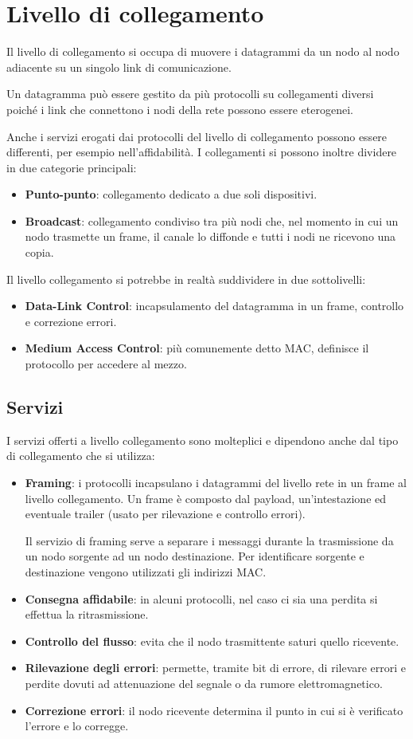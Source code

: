 \chapter{Livello di collegamento}
Il livello di collegamento si occupa di muovere i datagrammi da un
nodo al nodo adiacente su un singolo link di comunicazione.

Un datagramma può essere gestito da più protocolli su collegamenti 
diversi poiché i link che connettono i nodi della rete possono essere
eterogenei.

Anche i servizi erogati dai protocolli del livello di collegamento 
possono essere differenti, per esempio nell'affidabilità. I 
collegamenti si possono inoltre dividere in due categorie principali:
\begin{itemize}
	\item \textbf{Punto-punto}: collegamento dedicato a due soli 
		dispositivi.
	\item \textbf{Broadcast}: collegamento condiviso tra più nodi che,
		nel momento in cui un nodo trasmette un frame, il canale lo
		diffonde e tutti i nodi ne ricevono una copia.
\end{itemize}
Il livello collegamento si potrebbe in realtà suddividere in due 
sottolivelli:
\begin{itemize}
	\item \textbf{Data-Link Control}: incapsulamento del datagramma in
		un frame, controllo e correzione errori.
	\item \textbf{Medium Access Control}: più comunemente detto MAC, 
		definisce il protocollo per accedere al mezzo.
\end{itemize}

\section{Servizi}
I servizi offerti a livello collegamento sono molteplici e dipendono
anche dal tipo di collegamento che si utilizza:
\begin{itemize}
	\item \textbf{Framing}: i protocolli incapsulano i datagrammi del
		livello rete in un frame al livello collegamento. Un frame è
		composto dal payload, un'intestazione ed eventuale trailer
		(usato per rilevazione e controllo errori).

		Il servizio di framing serve a separare i messaggi durante la
		trasmissione da un nodo sorgente ad un nodo destinazione. Per
		identificare sorgente e destinazione vengono utilizzati gli
		indirizzi MAC.
	\item \textbf{Consegna affidabile}: in alcuni protocolli, nel caso
		ci sia una perdita si effettua la ritrasmissione.
	\item \textbf{Controllo del flusso}: evita che il nodo trasmittente
		saturi quello ricevente.
	\item \textbf{Rilevazione degli errori}: permette, tramite bit 
		di errore, di rilevare errori e perdite dovuti ad attenuazione
		del segnale o da rumore elettromagnetico.
	\item \textbf{Correzione errori}: il nodo ricevente determina il
		punto in cui si è verificato l'errore e lo corregge.
\end{itemize}

